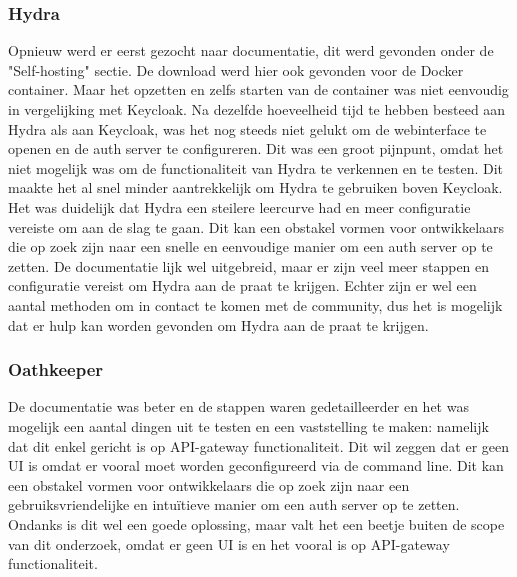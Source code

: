 \subsubsection{Hydra}%
\label{subsubsec:hydra}
Opnieuw werd er eerst gezocht naar documentatie, dit werd gevonden onder de "Self-hosting" sectie. De download werd hier ook gevonden voor de Docker container.
Maar het opzetten en zelfs starten van de container was niet eenvoudig in vergelijking met Keycloak. Na dezelfde hoeveelheid tijd te hebben besteed aan Hydra als aan Keycloak, was het nog steeds niet gelukt om de webinterface te openen en de auth server te configureren. 
Dit was een groot pijnpunt, omdat het niet mogelijk was om de functionaliteit van Hydra te verkennen en te testen. Dit maakte het al snel minder aantrekkelijk om Hydra te gebruiken boven Keycloak. Het was duidelijk dat Hydra een steilere leercurve had en meer configuratie vereiste om aan de slag te gaan. Dit kan een obstakel vormen voor ontwikkelaars die op zoek zijn naar een snelle en eenvoudige manier om een auth server op te zetten.
De documentatie lijk wel uitgebreid, maar er zijn veel meer stappen en configuratie vereist om Hydra aan de praat te krijgen. 
Echter zijn er wel een aantal methoden om in contact te komen met de community, dus het is mogelijk dat er hulp kan worden gevonden om Hydra aan de praat te krijgen.

\subsubsection{Oathkeeper}%
\label{subsubsec:oathkeeper}
De documentatie was beter en de stappen waren gedetailleerder en het was mogelijk een aantal dingen uit te testen en een vaststelling te maken: namelijk dat dit enkel gericht is op API-gateway functionaliteit. 
Dit wil zeggen dat er geen UI is omdat er vooral moet worden geconfigureerd via de command line. Dit kan een obstakel vormen voor ontwikkelaars die op zoek zijn naar een gebruiksvriendelijke en intuïtieve manier om een auth server op te zetten.
Ondanks is dit wel een goede oplossing, maar valt het een beetje buiten de scope van dit onderzoek, omdat er geen UI is en het vooral is op API-gateway functionaliteit.